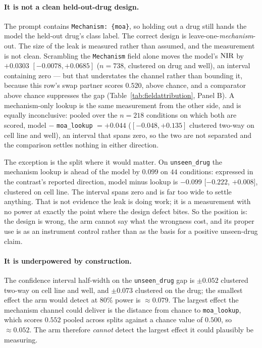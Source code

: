 \paragraph{It is not a clean held-out-drug design.} The prompt contains
\texttt{Mechanism: \{moa\}}, so holding out a drug still hands the model the held-out drug's class
label. The correct design is leave-one-\emph{mechanism}-out. The size of the leak is measured
rather than assumed, and the measurement is not clean. Scrambling the \texttt{Mechanism} field
alone moves the model's $\textrm{NIR}$ by $+0.0303$ \nolinebreak[3]$[-0.0078, +0.0685]$ ($n = 738$,
clustered on drug and well), an interval containing zero --- but that understates the channel rather
than bounding it, because this row's swap partner scores $0.520$, above chance, and a comparator
above chance suppresses the gap (Table~\ref{tab:fieldattribution}, Panel B). A mechanism-only lookup is the same measurement from the other
side, and is equally inconclusive: pooled over the $n = 218$ conditions on which both are scored, model $-$
\texttt{moa\_lookup} $= +0.044$ ($[-0.048, +0.135]$ clustered two-way on cell line and well), an
interval that spans zero, so the two are not separated and the comparison settles nothing in
either direction.

The exception is the split where it would matter. On \texttt{unseen\_drug} the mechanism lookup is
ahead of the model by $0.099$ on $44$ conditions: expressed in the contrast's reported direction,
model minus lookup is $-0.099$ [$-0.222$, $+0.008$], clustered on cell line. The interval spans zero
and is far too wide to settle anything. That is not
evidence the leak is doing work; it is a measurement with no power at exactly the point where the
design defect bites. So the position is: the design is wrong, the arm cannot say what the wrongness
cost, and its proper use is as an instrument control rather than as the basis for a positive
unseen-drug claim.

\paragraph{It is underpowered by construction.} The confidence interval half-width on the
\texttt{unseen\_drug} gap is $\pm 0.052$ clustered two-way on cell line and well, and $\pm 0.073$
clustered on the drug; the smallest effect the arm would detect at $80\%$ power is $\approx 0.079$.
The largest effect the mechanism channel could deliver is the distance from chance to
\texttt{moa\_lookup}, which scores $0.552$ pooled across splits against a chance value of
$0.500$, so $\approx 0.052$. The arm therefore \emph{cannot} detect the largest effect it
could plausibly be measuring.

